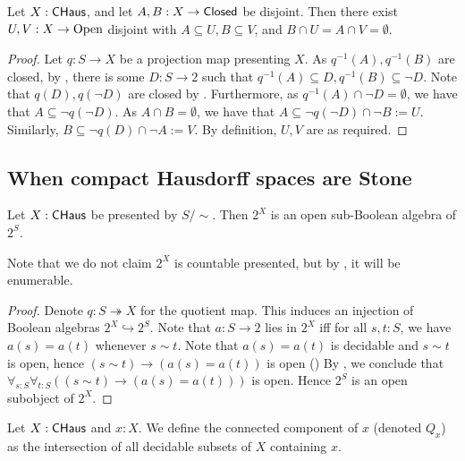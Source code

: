 \begin{lemma}\label{CHausSeperationOfClosedByOpens}
  Let $X:\mathsf{CHaus}$, and let $A,B:X\to \mathsf{Closed}$ be disjoint. 
  Then there exist $U,V:X\to \mathrm{Open}$ disjoint with $A\subseteq U, B\subseteq V$, 
  and $B\cap U = A \cap V = \emptyset$. 
\end{lemma}
\begin{proof}
  Let $q:S\to X$ be a projection map presenting $X$.
  As $q^{-1}(A), q^{-1}(B)$ are closed, 
  by , there is some $D:S \to 2$ such that
  $q^{-1}(A) \subseteq D, q^{-1}(B) \subseteq \neg D$. 
  Note that $q(D), q(\neg D)$ are closed by . 
  Furthermore, as $q^{-1}(A) \cap \neg D  =\emptyset$, we have that 
  $A\subseteq \neg q (\neg D)$. As $A\cap B = \emptyset$, we have that 
  $A\subseteq \neg q (\neg D) \cap \neg B:= U$.
  Similarly, $B\subseteq \neg  q (D) \cap \neg A:= V$. 
  By definition, $U,V$ are as required. 
\end{proof}

\subsection{When compact Hausdorff spaces are Stone}\label{ConnectedComponent}
\begin{lemma}
  Let $X:\mathsf{CHaus}$ be presented by $S/\sim$. 
  Then $2^X$ is an open sub-Boolean algebra of $2^S$. 
\end{lemma}
Note that we do not claim $2^X$ is countable presented, 
but by , it will be enumerable. 
\begin{proof}
  Denote $q:S \twoheadrightarrow X$ for the quotient map. 
  This induces an injection of Boolean algebras $2^X \hookrightarrow 2^S$.
  Note that $a:S\to 2$ lies in $2^X$ iff for all $s,t:S$, we have $a(s) = a(t)$ whenever $s\sim t$.
  Note that $a(s) = a(t)$ is decidable and $s\sim t$ is open, hence 
  $(s\sim t) \to (a(s) = a(t))$ is open ()
  By , we conclude that 
  $\forall_{s:S} \forall_{t:S} ((s\sim t) \to (a(s) = a(t)))$ is open. 
  Hence $2^S$ is an open subobject of $2^X$. 
\end{proof}

\begin{definition}
  Let $X:\mathsf{CHaus}$ and $x:X$. 
  We define the connected component of $x$ (denoted $Q_x$)
  as the intersection of all decidable subsets of $X$ containing $x$. 
\end{definition}

